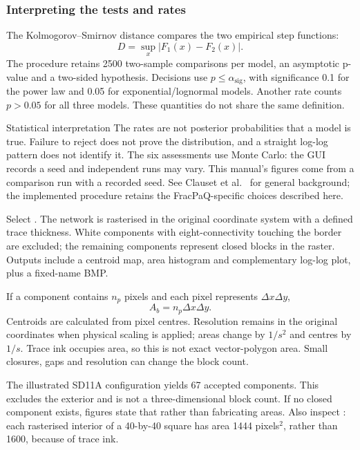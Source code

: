 \subsubsection{Interpreting the tests and rates}
The Kolmogorov--Smirnov distance compares the two empirical step functions:
\begin{equation}D=\sup_x|F_1(x)-F_2(x)|.\end{equation}
The procedure retains 2500 two-sample comparisons per model, an asymptotic p-value and a two-sided hypothesis. Decisions use \(p\leq\alpha_{\mathrm{sig}}\), with significance 0.1 for the power law and 0.05 for exponential/lognormal models. Another rate counts \(p>0.05\) for all three models. These quantities do not share the same definition.

\begin{note}{Statistical interpretation}
The rates are not posterior probabilities that a model is true. Failure to reject does not prove the distribution, and a straight log-log pattern does not identify it. The six assessments use Monte Carlo: the GUI records a seed and independent runs may vary. This manual's figures come from a comparison run with a recorded seed. See Clauset et al.~\cite{clauset} for general background; the implemented procedure retains the FracPaQ-specific choices described here.
\end{note}

Select . The network is rasterised in the original coordinate system with a defined trace thickness. White components with eight-connectivity touching the border are excluded; the remaining components represent closed blocks in the raster. Outputs include a centroid map, area histogram and complementary log-log plot, plus a fixed-name BMP.

If a component contains \(n_p\) pixels and each pixel represents \(\Delta x\Delta y\),
\begin{equation}A_b=n_p\Delta x\Delta y.\end{equation}
Centroids are calculated from pixel centres. Resolution remains in the original coordinates when physical scaling is applied; areas change by \(1/s^2\) and centres by \(1/s\). Trace ink occupies area, so this is not exact vector-polygon area. Small closures, gaps and resolution can change the block count.

The illustrated SD11A configuration yields 67 accepted components. This excludes the exterior and is not a three-dimensional block count. If no closed component exists, figures state that rather than fabricating areas. Also inspect : each rasterised interior of a 40-by-40 square has area 1444 pixels\(^{2}\), rather than 1600, because of trace ink.

